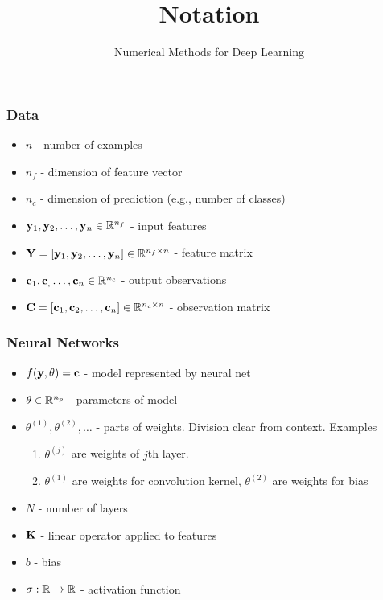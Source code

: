 \documentclass[12pt,fleqn]{beamer}
\title[Notations]{Notation}
\subtitle{Numerical Methods for Deep Learning}
\date{}
\begin{document}
\makebeamertitle

\begin{frame}
	\frametitle{Data}
	
	\begin{itemize}
		\item $n$ - number of examples
		\item $n_f$ - dimension of feature vector
		\item $n_c$ - dimension of prediction (e.g., number of classes)
		\item ${\bf y}_1,{\bf y}_2,\ldots,{\bf y}_n \in\mathbb{R}^{n_f}$ - input features
		\item ${\bf Y} = \left[{\bf y}_1,{\bf y}_2,\ldots,{\bf y}_n \right] \in \mathbb{R}^{n_f \times n}$ - feature matrix
		\item ${\bf c}_1,{\bf c}_,\ldots,{\bf c}_n \in \mathbb{R}^{n_c}$ - output observations 
		\item ${\bf C} = \left[{\bf c}_1, {\bf c}_2,\ldots,{\bf c}_n\right] \in \mathbb{R}^{n_c \times n}$ - observation matrix
	\end{itemize}
\end{frame} 

\begin{frame}
	\frametitle{Neural Networks}
	
	\begin{itemize}
		\item $f({\bf y},\theta) = {\bf c}$ - model represented by neural net
		\item $\theta \in \mathbb{R}^{n_p}$ - parameters of model
		\item $\theta^{(1)}, \theta^{(2)}, \ldots$ - parts of weights. Division clear from context. Examples
		\begin{enumerate}
			\item $\theta^{(j)}$ are weights of $j$th layer.
			\item $\theta^{(1)}$ are weights for convolution kernel, $\theta^{(2)}$ are weights for bias
		\end{enumerate}
		
		\item $N$ - number of layers
		\item ${\bf K}$ - linear operator applied to features
		\item $b$    - bias
		\item $\sigma : \mathbb{R}\to\mathbb{R}$ - activation function
	\end{itemize}
\end{frame} 
\end{document}
